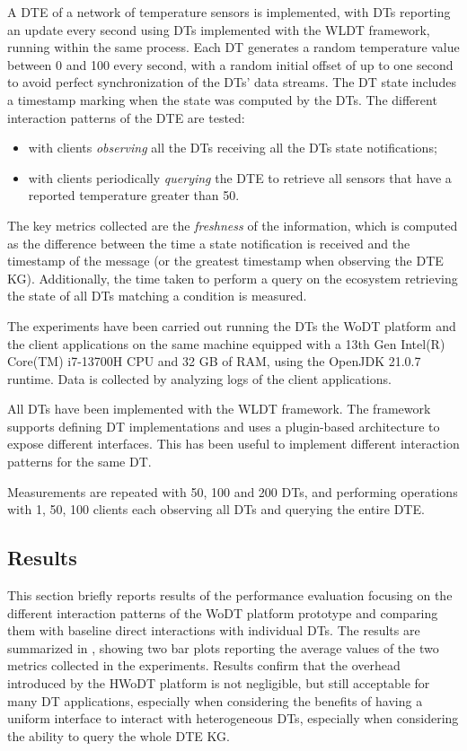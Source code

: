 A \ac{DTE} of a network of temperature sensors is implemented, with \acp{DT} reporting an update every second using \acp{DT} implemented with the \ac{WLDT} framework, running within the same process.
%
Each \ac{DT} generates a random temperature value between 0 and 100 every second, with a random initial offset of up to one second to avoid perfect synchronization of the \acp{DT}' data streams. The \ac{DT} state includes a timestamp marking when the state was computed by the \acp{DT}.
%
The different interaction patterns of the \ac{DTE} are tested:
\begin{itemize}
    \item with clients \emph{observing} all the \acp{DT} receiving all the \acp{DT} state notifications;
    \item with clients periodically \emph{querying} the \ac{DTE} to retrieve all sensors that have a reported temperature greater than 50. 
\end{itemize}
%
The key metrics collected are the \emph{freshness} of the information, which is computed as the difference between the time a state notification is received and the timestamp of the message (or the greatest timestamp when observing the \ac{DTE} \ac{KG}).
%
Additionally, the time taken to perform a query on the ecosystem retrieving the state of all \acp{DT} matching a condition is measured.

The experiments have been carried out running the \acp{DT} the \ac{WoDT} platform and the client applications on the same machine equipped with a 13th Gen Intel(R) Core(TM) i7-13700H CPU and 32 GB of RAM, using the OpenJDK 21.0.7 runtime.
%
Data is collected by analyzing logs of the client applications.

All \acp{DT} have been implemented with the \ac{WLDT} framework. 
The framework supports defining \ac{DT} implementations and uses a plugin-based architecture to expose different interfaces. 
This has been useful to implement different interaction patterns for the same \ac{DT}.

Measurements are repeated with 50, 100 and 200 \acp{DT}, and performing operations with 1, 50, 100 clients each observing all \acp{DT} and querying the entire \ac{DTE}.


\subsection{Results}

This section briefly reports results of the performance evaluation focusing on the different interaction patterns of the \ac{WoDT} platform prototype and comparing them with baseline direct interactions with individual \acp{DT}.
%
The results are summarized in , showing two bar plots reporting the average values of the two metrics collected in the experiments.
%
Results confirm that the overhead introduced by the \ac{HWoDT} platform is not negligible, but still acceptable for many \ac{DT} applications, especially when considering the benefits of having a uniform interface to interact with heterogeneous \acp{DT}, especially when considering the ability to query the whole \ac{DTE} \ac{KG}.


